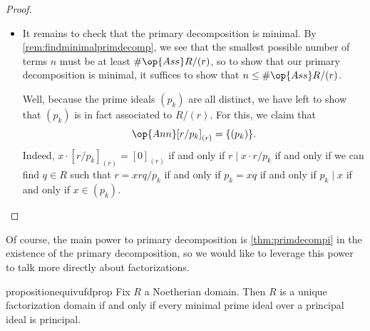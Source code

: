 \documentclass[../notes.tex]{subfiles}
\begin{document}
\begin{proof}
\begin{itemize}
		\item It remains to check that the primary decomposition is minimal. By \autoref{rem:findminimalprimdecomp}, we see that the smallest possible number of terms $n$ must be at least $\#\op{Ass}R/(r)$, so to show that our primary decomposition is minimal, it suffices to show that $n\le\#\op{Ass}R/(r)$.

		Well, because the prime ideals $(p_k)$ are all distinct, we have left to show that $(p_k)$ is in fact associated to $R/(r)$. For this, we claim that
		\[\op{Ann}[r/p_k]_{(r)}=\{(p_k)\}.\]
		Indeed, $x\cdot[r/p_k]_{(r)}=[0]_{(r)}$ if and only if $r\mid x\cdot r/p_k$ if and only if we can find $q\in R$ such that $r=xrq/p_k$ if and only if $p_k=xq$ if and only if $p_k\mid x$ if and only if $x\in(p_k)$.
		\qedhere
	\end{itemize}
\end{proof}
Of course, the main power to primary decomposition is \autoref{thm:primdecompi} in the existence of the primary decomposition, so we would like to leverage this power to talk more directly about factorizations.
\begin{restatable}{proposition}{equivufdprop} \label{prop:equivufd}
	Fix $R$ a Noetherian domain. Then $R$ is a unique factorization domain if and only if every minimal prime ideal over a principal ideal is principal.
\end{restatable}
\end{document}
